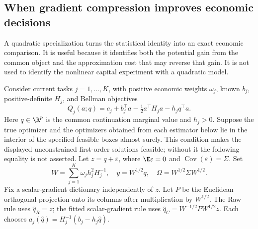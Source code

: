 \subsection{When gradient compression improves economic decisions}
\label{sec:r16decisionvalue}
A quadratic specialization turns the statistical identity into an exact economic comparison. It is useful because it identifies both the potential gain from the common object and the approximation cost that may reverse that gain. It is not used to identify the nonlinear capital experiment with a quadratic model.

Consider current tasks $j=1,\ldots,K$, with positive economic weights $\omega_j$, known $b_j$, positive-definite $H_j$, and Bellman objectives
\[
 Q_j(a;q)=c_j+b_j^\top a-\tfrac12 a^\top H_j a-h_j q^\top a.
\]
Here $q\in\R^p$ is the common continuation marginal value and $h_j>0$. Suppose the true optimizer and the optimizers obtained from each estimator below lie in the interior of the specified feasible boxes almost surely. This condition makes the displayed unconstrained first-order solutions feasible; without it the following equality is not asserted. Let $z=q+\varepsilon$, where $\E\varepsilon=0$ and $\operatorname{Cov}(\varepsilon)=\Sigma$. Set
\[
 W=\sum_{j=1}^K\omega_jh_j^2H_j^{-1},\quad
 y=W^{1/2}q,\quad \Omega=W^{1/2}\Sigma W^{1/2}.
\]
Fix a scalar-gradient dictionary independently of $z$. Let $P$ be the Euclidean orthogonal projection onto its columns after multiplication by $W^{1/2}$. The Raw rule uses $\widehat q_R=z$; the fitted scalar-gradient rule uses $\widehat q_C=W^{-1/2}PW^{1/2}z$. Each chooses $a_j(\widehat q)=H_j^{-1}(b_j-h_j\widehat q)$.

